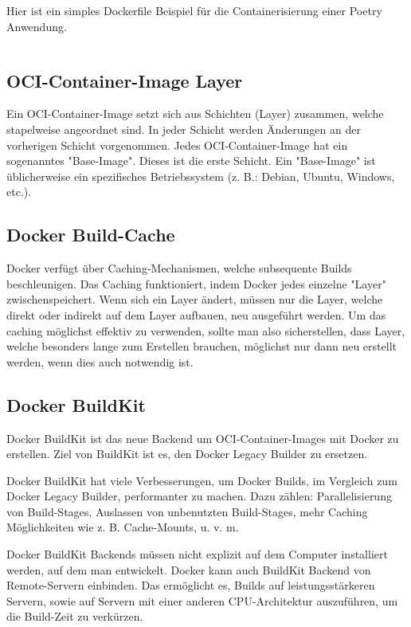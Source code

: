 \documentclass[
  12pt,
  a4paper,
  printlength,
  bibliography=totoc,
  chapterprefix,
  headings=openright,
  numbers=endperiod,
  parskip=half,
  twoside
]{scrreprt}
\begin{document}
Hier ist ein simples Dockerfile Beispiel für die Containerisierung einer Poetry Anwendung.

\inputminted{docker}{./code-examples/Dockerfile.example}

\subsection{OCI-Container-Image Layer}

Ein OCI-Container-Image setzt sich aus Schichten (Layer) zusammen, welche stapelweise angeordnet sind. In jeder Schicht werden Änderungen an der vorherigen Schicht vorgenommen. Jedes OCI-Container-Image hat ein sogenanntes "Base-Image". Dieses ist die erste Schicht. Ein "Base-Image" ist üblicherweise ein spezifisches Betriebssystem (z. B.: Debian, Ubuntu, Windows, etc.).

\subsection{Docker Build-Cache}

Docker verfügt über Caching-Mechanismen, welche subsequente Builds beschleunigen. Das Caching funktioniert, indem Docker jedes einzelne "Layer" zwischenspeichert. Wenn sich ein Layer ändert, müssen nur die Layer, welche direkt oder indirekt auf dem Layer aufbauen, neu ausgeführt werden. Um das caching möglichst effektiv zu verwenden, sollte man also sicherstellen, dass Layer, welche besonders lange zum Erstellen brauchen, möglichst nur dann neu erstellt werden, wenn dies auch notwendig ist.

\subsection{Docker BuildKit}

Docker BuildKit ist das neue Backend um OCI-Container-Images mit Docker zu erstellen. Ziel von BuildKit ist es, den Docker Legacy Builder zu ersetzen.

Docker BuildKit hat viele Verbesserungen, um Docker Builds, im Vergleich zum Docker Legacy Builder, performanter zu machen. Dazu zählen: Parallelisierung von Build-Stages, Auslassen von unbenutzten Build-Stages, mehr Caching Möglichkeiten wie z. B. Cache-Mounts, u. v. m.

Docker BuildKit Backends müssen nicht explizit auf dem Computer installiert werden, auf dem man entwickelt. Docker kann auch BuildKit Backend von Remote-Servern einbinden. Das ermöglicht es, Builds auf leistungsstärkeren Servern, sowie auf Servern mit einer anderen CPU-Architektur auszuführen, um die Build-Zeit zu verkürzen.
\end{document}
